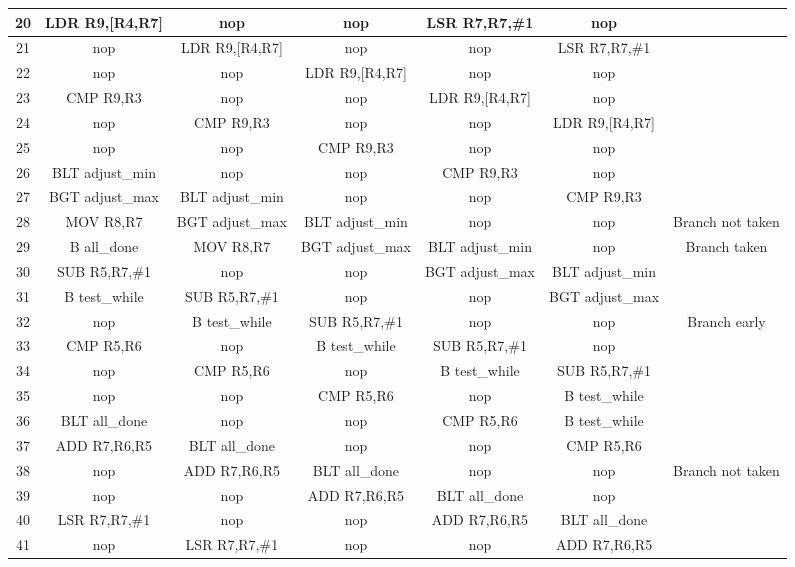 \documentclass{article}
\begin{document}
{\begin{landscape}
\begin{longtable}{|c|c|c|c|c|c|c|}
            20 & LDR R9,[R4,R7] & nop & nop & LSR R7,R7,\#1 & nop & \\ \hline
            21 & nop & LDR R9,[R4,R7] & nop & nop & LSR R7,R7,\#1 & \\ \hline
            22 & nop & nop & LDR R9,[R4,R7] & nop & nop & \\ \hline
            23 & CMP R9,R3 & nop & nop & LDR R9,[R4,R7] & nop & \\ \hline
            24 & nop & CMP R9,R3 & nop & nop & LDR R9,[R4,R7] & \\ \hline
            25 & nop & nop & CMP R9,R3 & nop & nop & \\ \hline
            26 & BLT adjust\_min & nop & nop & CMP R9,R3 & nop & \\ \hline
            27 & BGT adjust\_max & BLT adjust\_min & nop & nop & CMP R9,R3 & \\ \hline
            28 & MOV R8,R7 & BGT adjust\_max & BLT adjust\_min & nop & nop & Branch not taken \\ \hline
            29 & B all\_done & MOV R8,R7 & BGT adjust\_max & BLT adjust\_min & nop & Branch taken \\ \hline
            30 & SUB R5,R7,\#1 & nop & nop & BGT adjust\_max & BLT adjust\_min & \\ \hline
            31 & B test\_while & SUB R5,R7,\#1 & nop & nop & BGT adjust\_max & \\ \hline
            32 & nop & B test\_while & SUB R5,R7,\#1 & nop & nop & Branch early \\ \hline
            33 & CMP R5,R6 & nop & B test\_while & SUB R5,R7,\#1 & nop & \\ \hline
            34 & nop & CMP R5,R6 & nop & B test\_while & SUB R5,R7,\#1 & \\ \hline
            35 & nop & nop & CMP R5,R6 & nop & B test\_while & \\ \hline
            36 & BLT all\_done & nop & nop & CMP R5,R6 & B test\_while & \\ \hline
            37 & ADD R7,R6,R5 & BLT all\_done & nop & nop & CMP R5,R6 & \\ \hline
            38 & nop & ADD R7,R6,R5 & BLT all\_done & nop & nop & Branch not taken \\ \hline
            39 & nop & nop & ADD R7,R6,R5 & BLT all\_done & nop & \\ \hline
            40 & LSR R7,R7,\#1 & nop & nop & ADD R7,R6,R5 & BLT all\_done & \\ \hline
            41 & nop & LSR R7,R7,\#1 & nop & nop & ADD R7,R6,R5 & \\ \hline

\end{longtable}
\end{landscape}}
\end{document}
